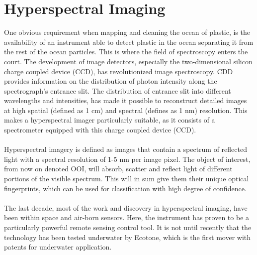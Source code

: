\section{Hyperspectral Imaging}
One obvious requirement when mapping and cleaning the ocean of plastic, is the availability of an instrument able to detect plastic in the ocean separating it from the rest of the ocean particles. This is where the field of spectroscopy enters the court. The development of image detectors, especially the two-dimensional silicon charge coupled device (CCD), has revolutionized image spectroscopy. CDD provides information on the distribution of photon intensity along the spectrograph's entrance slit. The distribution of entrance slit into different wavelengths and intensities, has made it possible to reconstruct detailed images at high spatial (defined as 1 cm) and spectral (defines as 1 nm) resolution. This makes a hyperspectral imager particularly suitable, as it consists of a spectrometer equipped with this charge coupled device (CCD). 
\\\\
Hyperspectral imagery is defined as images that contain a spectrum of reflected light with a spectral resolution of 1-5 nm per image pixel. The object of interest, from now on denoted OOI, will absorb, scatter and reflect light of different portions of the visible spectrum. This will in sum give them their unique optical fingerprints, which can be used for classification with high degree of confidence.
\\\\
The last decade, most of the work and discovery in hyperspectral imaging, have been within space and air-born sensors. Here, the instrument has proven to be a particularly powerful remote sensing control tool. It is not until recently that the technology has been tested underwater by Ecotone, which is the first mover with patents for underwater application. 
\\\\
